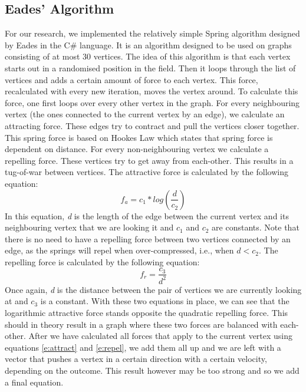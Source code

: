 \documentclass[a4paper,12pt]{article}
\begin{document}
\subsection{Eades' Algorithm}\label{s:algorithm}
For our research, we implemented the relatively simple Spring algorithm designed by Eades in the C\# language. It is an algorithm designed to be used on graphs consisting of at most 30 vertices. The idea of this algorithm is that each vertex starts out in a randomised position in the field. Then it loops through the list of vertices and adds a certain amount of force to each vertex. This force, recalculated with every new iteration, moves the vertex around. To calculate this force, one first loops over every other vertex in the graph. For every neighbouring vertex (the ones connected to the current vertex by an edge), we calculate an attracting force. These edges try to contract and pull the vertices closer together. This spring force is based on Hookes Law\cite{Hooke} which states that spring force is dependent on distance. For every non-neighbouring vertex we calculate a repelling force. These vertices try to get away from each-other. This results in a tug-of-war between vertices.
\newline
The attractive force is calculated by the following equation:
\begin{equation}\label{e:attract}
f_a = c_1*log(\frac{d}{c_2})
\end{equation}
In this equation, \emph{d} is the length of the edge between the current vertex and its neighbouring vertex that we are looking it and \emph{$c_1$} and \emph{$c_2$} are constants. Note that there is no need to have a repelling force between two vertices connected by an edge, as the springs will repel when over-compressed, i.e., when $d < c_2$.
\newline
The repelling force is calculated by the following equation:
\begin{equation}\label{e:repel}
f_r = \frac{c_3}{d^2}
\end{equation}
Once again, \emph{d} is the distance between the pair of vertices we are currently looking at and \emph{$c_3$} is a constant. With these two equations in place, we can see that the logarithmic attractive force stands opposite the quadratic repelling force. This should in theory result in a graph where these two forces are balanced with each-other.
\newline
After we have calculated all forces that apply to the current vertex using equations \ref{e:attract} and \ref{e:repel}, we add them all up and we are left with a vector that pushes a vertex in a certain direction with a certain velocity, depending on the outcome. This result however may be too strong and so we add a final equation.
\end{document}
